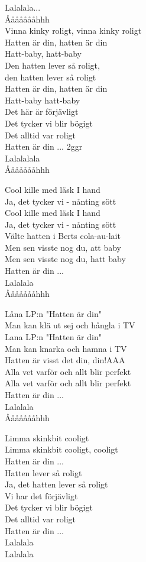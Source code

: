 \vspace{10pt}
Lalalala...\\
Åååååååhhh\\
Vinna kinky roligt, vinna kinky roligt\\
Hatten är din, hatten är din\\
Hatt-baby, hatt-baby\\
Den hatten lever så roligt,\\
den hatten lever så roligt\\
Hatten är din, hatten är din\\
Hatt-baby hatt-baby\\
Det här är förjävligt\\
Det tycker vi blir bögigt\\
Det alltid var roligt\\
Hatten är din ... 2ggr\\
Lalalalala\\
Åååååååhhh\par
\vspace{10pt}
Cool kille med läsk I hand\\
Ja, det tycker vi - nånting sött\\
Cool kille med läsk I hand\\
Ja, det tycker vi - nånting sött\\
\revrpt Välte hatten i Berts cola-au-lait\rpt \\
\revrpt Men sen visste nog du, att baby\rpt \\
\revrpt Men sen visste nog du, hatt baby\rpt \\
Hatten är din ...\\
Lalalala\\
Åååååååhhh\par
\vspace{10pt}
Låna LP:n "Hatten är din"\\
Man kan klä ut sej och hångla i TV\\
Lana LP:n "Hatten är din"\\
Man kan knarka och hamna i TV\\
\revrpt Hatten är visst det din, din!AAA\rpt \\
\revrpt Alla vet varför och allt blir perfekt \\
Alla vet varför och allt blir perfekt\rpt \\
Hatten är din ... \\
Lalalala\\
Åååååååhhh\par
\vspace{10pt}
Limma skinkbit cooligt\\
Limma skinkbit cooligt, cooligt\\
Hatten är din ...\\
\revrpt Hatten lever så roligt\rpt \\
Ja, det hatten lever så roligt\\
Vi har det förjävligt\\
Det tycker vi blir bögigt\\
Det alltid var roligt\\
\revrpt Hatten är din ...\rpt \\
Lalalala\\
Lalalala
